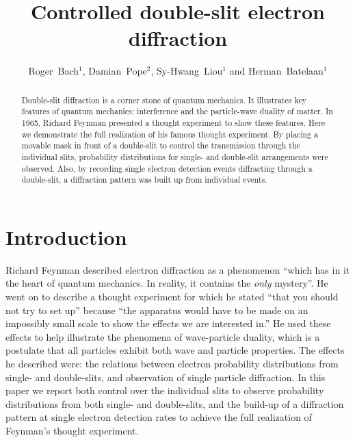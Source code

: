 \documentclass[12pt]{iopart}					%
\begin{document}
\title{Controlled double-slit electron diffraction}

\author{Roger~Bach$^1$, Damian~Pope$^2$, Sy-Hwang~Liou$^1$ and Herman~Batelaan$^1$}

\address{$^1$ Department of Physics and Astronomy, University of Nebraska-Lincoln, Theodore P. Jorgensen Hall, Lincoln, NE 68588, USA.}
\address{$^2$ Perimeter Institute for Theoretical Physics, 31 Caroline ST N Waterloo, Ontario, Canada N2L2Y5.}

\begin{abstract}
Double-slit diffraction is a corner stone of quantum mechanics.
It illustrates key features of quantum mechanics: interference and the particle-wave duality of matter.
In 1965, Richard Feynman presented a thought experiment to show these features. Here we demonstrate the full realization
of his famous thought experiment. By placing a movable mask in front of a double-slit to control the transmission
through the individual slits, probability distributions for single- and double-slit arrangements were observed.
Also, by recording single electron detection events diffracting through a double-slit, a diffraction pattern was
built up from individual events.
\end{abstract}
\maketitle

\section{Introduction}
Richard Feynman described electron diffraction as a phenomenon ``which has in it the heart of quantum mechanics.
In reality, it contains the \emph{only} mystery''\cite{Feynman65}. He went on to describe a thought experiment for 
which he stated ``that you should not try to set up'' because ``the apparatus would have to be made on an impossibly small
scale to show the effects we are interested in.''  
He used these effects to help illustrate the phenomena of wave-particle duality, which is a postulate that all particles exhibit both wave and particle properties.
The effects he described were: the relations between electron probability distributions from single- and double-slits,
and observation of single particle diffraction.
In this paper we report both control over the individual slits to observe probability distributions from both single- and double-slits, and
the build-up of a diffraction pattern at single electron detection rates to achieve the full realization of Feynman's thought experiment.
\end{document}
